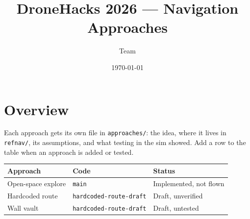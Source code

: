 \documentclass[11pt]{article}
\title{DroneHacks 2026 --- Navigation Approaches}
\author{Team}
\date{\today}
\begin{document}
\maketitle

\section{Overview}
Each approach gets its own file in \texttt{approaches/}: the idea, where it lives in
\texttt{refnav/}, its assumptions, and what testing in the sim showed.
Add a row to the table when an approach is added or tested.

\begin{table}[h]
\centering
\begin{tabular}{lll}
\toprule
Approach & Code & Status \\
\midrule
Open-space explore & \texttt{main} & Implemented, not flown \\
Hardcoded route    & \texttt{hardcoded-route-draft} & Draft, unverified \\
Wall vault         & \texttt{hardcoded-route-draft} & Draft, untested \\
\bottomrule
\end{tabular}
\end{table}




\end{document}
